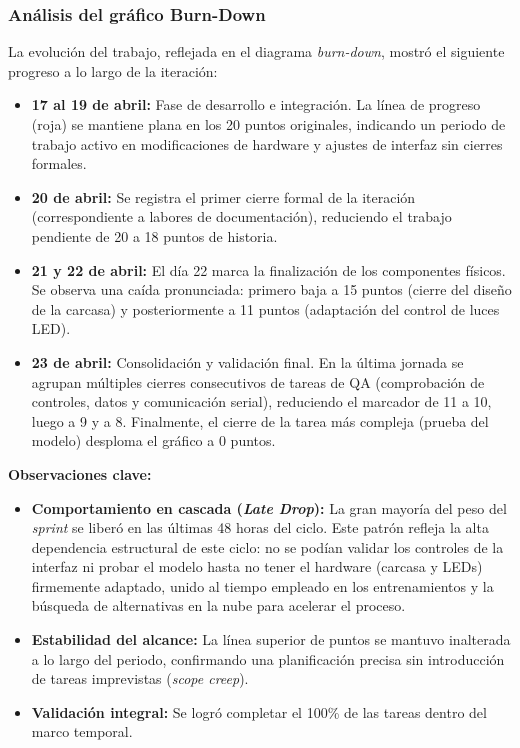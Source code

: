 \subsubsection{Análisis del gráfico Burn-Down}

La evolución del trabajo, reflejada en el diagrama \textit{burn-down}, mostró el siguiente progreso a lo largo de la iteración:

\begin{itemize}
    \item \textbf{17 al 19 de abril:} Fase de desarrollo e integración. La línea de progreso (roja) se mantiene plana en los 20 puntos originales, indicando un periodo de trabajo activo en modificaciones de hardware y ajustes de interfaz sin cierres formales.
    \item \textbf{20 de abril:} Se registra el primer cierre formal de la iteración (correspondiente a labores de documentación), reduciendo el trabajo pendiente de 20 a 18 puntos de historia.
    \item \textbf{21 y 22 de abril:} El día 22 marca la finalización de los componentes físicos. Se observa una caída pronunciada: primero baja a 15 puntos (cierre del diseño de la carcasa) y posteriormente a 11 puntos (adaptación del control de luces LED).
    \item \textbf{23 de abril:} Consolidación y validación final. En la última jornada se agrupan múltiples cierres consecutivos de tareas de QA (comprobación de controles, datos y comunicación serial), reduciendo el marcador de 11 a 10, luego a 9 y a 8. Finalmente, el cierre de la tarea más compleja (prueba del modelo) desploma el gráfico a 0 puntos.
\end{itemize}


\noindent\textbf{Observaciones clave:}
\begin{itemize}
    \item \textbf{Comportamiento en cascada (\textit{Late Drop}):} La gran mayoría del peso del \textit{sprint} se liberó en las últimas 48 horas del ciclo. Este patrón refleja la alta dependencia estructural de este ciclo: no se podían validar los controles de la interfaz ni probar el modelo hasta no tener el hardware (carcasa y LEDs) firmemente adaptado, unido al tiempo empleado en los entrenamientos y la búsqueda de alternativas en la nube para acelerar el proceso.
    \item \textbf{Estabilidad del alcance:} La línea superior de puntos se mantuvo inalterada a lo largo del periodo, confirmando una planificación precisa sin introducción de tareas imprevistas (\textit{scope creep}).
    \item \textbf{Validación integral:} Se logró completar el 100\% de las tareas  dentro del marco temporal.
\end{itemize}

